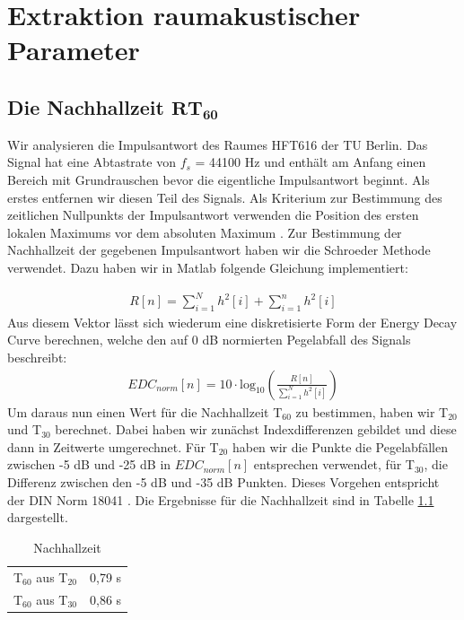 \chapter{Extraktion raumakustischer Parameter}
\section{Die Nachhallzeit $\mathbf{RT_{60}}$}
\label{sec:rt60}Wir analysieren die Impulsantwort des Raumes HFT616 der TU Berlin.
Das Signal hat eine Abtastrate von $f_s$ = 44100 Hz und enthält am Anfang einen Bereich mit Grundrauschen bevor die eigentliche Impulsantwort beginnt.
Als erstes entfernen wir diesen Teil des Signals.
Als Kriterium zur Bestimmung des zeitlichen Nullpunkts der Impulsantwort verwenden die Position des ersten lokalen Maximums vor dem absoluten Maximum .
Zur Bestimmung der Nachhallzeit der gegebenen Impulsantwort haben wir die Schroeder Methode \cite{Schroeder65} verwendet.
Dazu haben wir in Matlab folgende Gleichung implementiert:

\begin{align*}
R[n] = \sum_{i=1}^N h^2[i] + \sum_{i=1}^n h^2[i]
\end{align*}
Aus diesem Vektor lässt sich wiederum eine diskretisierte Form der Energy Decay Curve berechnen, welche den auf 0 dB normierten Pegelabfall des Signals  beschreibt:
\begin{align*}
EDC_{norm}[n] = 10 \cdot \mathrm{log}_{10} \left(\frac{R[n]}{\sum_{i=1}^N h^2[i]}\right)
\end{align*}
Um daraus nun einen Wert für die Nachhallzeit T$_{60}$ zu bestimmen, haben wir T$_{20}$ und T$_{30}$ berechnet.
Dabei haben wir zunächst Indexdifferenzen gebildet und diese dann in Zeitwerte umgerechnet.
Für T$_{20}$ haben wir die Punkte die Pegelabfällen zwischen -5 dB und -25 dB in $EDC_{norm}[n]$ entsprechen verwendet, für T$_{30}$, die Differenz zwischen den -5 dB und -35 dB Punkten.
Dieses Vorgehen entspricht der DIN Norm 18041 \cite{DIN_18041}.
Die Ergebnisse für die Nachhallzeit sind in Tabelle \ref{tab:T} dargestellt.

\begin{table}[H]
\centering
\caption{Nachhallzeit}
\label{tab:T}
\begin{tabular}{ | c | c |}
  \hline
  T$_{60}$ aus T$_{20}$ &  0,79 s \\
  T$_{60}$ aus T$_{30}$ &  0,86 s \\
  \hline
  \end{tabular}
\end{table}


